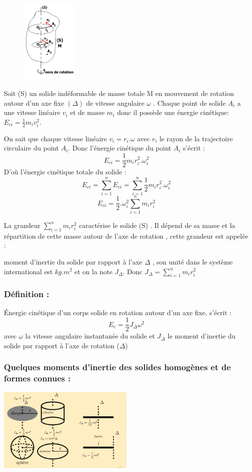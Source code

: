 \documentclass[12pt]{article}
\begin{document}
\begin{figure}
    \includegraphics[width=0.25\textwidth]{./img/img01.png}
\end{figure}

Soit (S) un solide indéformable de masse totale M en mouvement de
rotation autour d’un axe fixe $(\Delta)$ de vitesse angulaire $\omega$ . Chaque point
de solide $A_i$ a une vitesse linéaire $v_i$ et de masse $m_i$
donc il possède une énergie cinétique: $E_{ci} = \frac{1}{2}m_iv^2_i$.

On sait que chaque vitesse linéaire $v_i = r_i.\omega$ avec $r_i$ le rayon de la trajectoire circulaire du point $A_i$. Donc l’énergie cinétique du point $A_i$ s’écrit : 
$$E_{ci} = \frac{1}{2}m_ir^2_i.\omega^2_i$$
D’où l’énergie cinétique totale du solide : 
$$E_{ci} = \sum_{i = 1}^n E_{ci} = \sum_{i = 1}^n\frac{1}{2}m_ir^2_i.\omega^2_i$$
$$E_{ci} = \frac{1}{2}.\omega^2_i\sum_{i = 1}^nm_ir^2_i$$

La grandeur $\sum_{i = 1}^nm_ir^2_i$ caractérise le solide (S) . Il dépend de sa masse et la répartition de cette masse autour de l’axe de rotation , cette grandeur est appelée : 

moment d’inertie du solide par rapport à l’axe $\Delta$ , son unité  dans le système international est $kg.m^2$ et on la note $J_{\Delta}$.
Donc $J_{\Delta} = \sum_{i = 1}^nm_ir^2_i$

\subsubsection {Définition : }
Énergie cinétique d’un corps solide en rotation autour d’un axe fixe, s’écrit : $$E_{c} = \frac{1}{2}J_{\Delta}\omega^2$$
avec $\omega$ la vitesse angulaire instantanée du solide et $J_{\Delta}$ le moment d’inertie du solide par rapport à l’axe de rotation ($\Delta$)
\subsubsection{Quelques moments d’inertie des solides homogènes et de formes connues :}
\begin{center}
\includegraphics[width=0.50\textwidth]{./img/img00.png}
\end{center}
\end{document}
